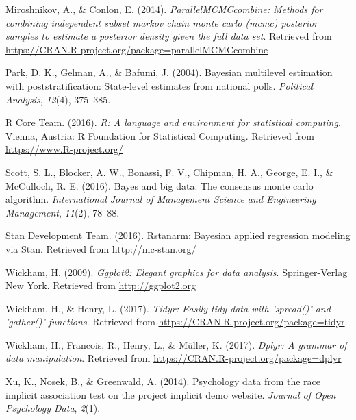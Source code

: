 \documentclass[english,floatsintext,man]{apa6}
\theoremstyle{definition}
\theoremstyle{definition}
\theoremstyle{remark}
\begin{document}
\hypertarget{ref-miroshnikov2014parallel}{}
Miroshnikov, A., \& Conlon, E. (2014). \emph{ParallelMCMCcombine:
Methods for combining independent subset markov chain monte carlo (mcmc)
posterior samples to estimate a posterior density given the full data
set}. Retrieved from
\url{https://CRAN.R-project.org/package=parallelMCMCcombine}

\hypertarget{ref-park2004bayesian}{}
Park, D. K., Gelman, A., \& Bafumi, J. (2004). Bayesian multilevel
estimation with poststratification: State-level estimates from national
polls. \emph{Political Analysis}, \emph{12}(4), 375--385.

\hypertarget{ref-rcitation}{}
R Core Team. (2016). \emph{R: A language and environment for statistical
computing}. Vienna, Austria: R Foundation for Statistical Computing.
Retrieved from \url{https://www.R-project.org/}

\hypertarget{ref-scott2016bayes}{}
Scott, S. L., Blocker, A. W., Bonassi, F. V., Chipman, H. A., George, E.
I., \& McCulloch, R. E. (2016). Bayes and big data: The consensus monte
carlo algorithm. \emph{International Journal of Management Science and
Engineering Management}, \emph{11}(2), 78--88.

\hypertarget{ref-rstanarm2016}{}
Stan Development Team. (2016). Rstanarm: Bayesian applied regression
modeling via Stan. Retrieved from \url{http://mc-stan.org/}

\hypertarget{ref-wickham2009ggplot2}{}
Wickham, H. (2009). \emph{Ggplot2: Elegant graphics for data analysis}.
Springer-Verlag New York. Retrieved from \url{http://ggplot2.org}

\hypertarget{ref-wickham2017tidyr}{}
Wickham, H., \& Henry, L. (2017). \emph{Tidyr: Easily tidy data with
'spread()' and 'gather()' functions}. Retrieved from
\url{https://CRAN.R-project.org/package=tidyr}

\hypertarget{ref-wickham2017dplyr}{}
Wickham, H., Francois, R., Henry, L., \& Müller, K. (2017). \emph{Dplyr:
A grammar of data manipulation}. Retrieved from
\url{https://CRAN.R-project.org/package=dplyr}

\hypertarget{ref-xu2014psychology}{}
Xu, K., Nosek, B., \& Greenwald, A. (2014). Psychology data from the
race implicit association test on the project implicit demo website.
\emph{Journal of Open Psychology Data}, \emph{2}(1).
\end{document}
